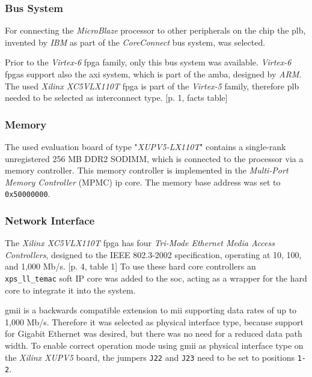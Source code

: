 \subsubsection{Bus System}

For connecting the \textit{MicroBlaze} processor to other peripherals on the chip the \gls{plb}, invented by \textit{IBM} as part of the \textit{CoreConnect} bus system, was selected.

Prior to the \textit{Virtex-6} \gls{fpga} family, only this bus system was available. \textit{Virtex-6} \gls{fpga}s support also the \gls{axi} system, which is part of the \gls{amba}, designed by \textit{ARM}. The used \textit{Xilinx XC5VLX110T} \gls{fpga} is part of the \textit{Virtex-5} family, therefore \gls{plb} needed to be selected as interconnect type. \cite{axi_interconnect}[p. 1, facts table]
\\

\subsubsection{Memory}

The used evaluation board of type "\textit{XUPV5-LX110T}" contains a single-rank unregistered 256 MB DDR2 SODIMM, which is connected to the processor via a memory controller. This memory controller is implemented in the \textit{Multi-Port Memory Controller} (MPMC) \gls{ip} core. The memory base address was set to \texttt{0x50000000}.

\subsubsection{Network Interface}
\label{preceeding:net}

The \textit{Xilinx XC5VLX110T} \gls{fpga} has four \textit{Tri-Mode Ethernet Media Access Controllers}, designed to the IEEE 802.3-2002 specification, operating at 10, 100, and 1,000 Mb/s. \cite{virtex5}[p. 4, table 1] To use these hard core controllers an \texttt{xps\_ll\_temac} soft IP core was added to the \gls{soc}, acting as a wrapper for the hard core to integrate it into the system.


\gls{gmii} is a backwards compatible extension to \gls{mii} supporting data rates of up to 1,000 Mb/s. Therefore it was selected as physical interface type, because support for Gigabit Ethernet was desired, but there was no need for a reduced data path width. To enable correct operation mode using \gls{gmii} as physical interface type on the \textit{Xilinx XUPV5} board, the jumpers \texttt{J22} and \texttt{J23} need to be set to positions \texttt{1-2}.

